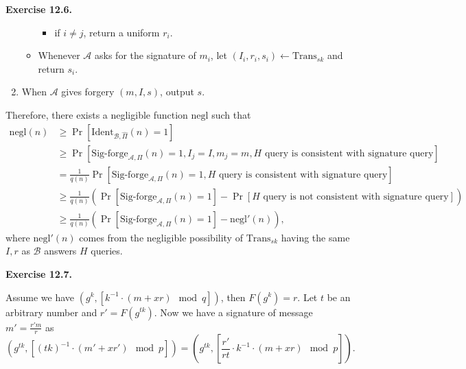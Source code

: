 \documentclass[a4paper]{article}
\newenvironment{exercise}[1]{
	\par
	\noindent\textbf{Exercise #1.}\quad
}{
	\par
	\bigskip
}
\newcommand{\pbra}[1]{\left( #1 \right)}
\newcommand{\sbra}[1]{\left[ #1 \right]}
\newcommand{\Trans}{\mathrm{Trans}}
\newcommand{\Sigforge}{{\mathrm{Sig}\text{-}\mathrm{forge}}}
\newcommand{\Ident}{\mathrm{Ident}}
\newcommand{\negl}{\mathrm{negl}}
\newcommand{\Acal}{\mathcal{A}}
\newcommand{\Bcal}{\mathcal{B}}
\begin{document}
\begin{exercise}{12.6}
\begin{enumerate}
\begin{itemize}
\begin{itemize}
                    \item if $i\neq j$, return a uniform $r_i$.
                \end{itemize}
            \item Whenever $\Acal$ asks for the signature of $m_i$, let $(I_i,r_i,s_i)\gets\Trans_{sk}$
                and return $s_i$.
            \end{itemize}
        \item When $\Acal$ gives forgery $(m,I,s)$, output $s$.
    \end{enumerate}
    Therefore, there exists a negligible function $\negl$ such that
    \begin{align*}
        \negl(n)&\geq\Pr\sbra{\Ident_{\Bcal,\widehat\Pi}(n)=1}\\
        &\geq\Pr\sbra{\Sigforge_{\Acal,\Pi}(n)=1,I_j=I, m_j=m,
        H\text{ query is consistent with signature query}}\\
        &=\frac1{q(n)}\Pr\sbra{\Sigforge_{\Acal,\Pi}(n)=1,
        H\text{ query is consistent with signature query}}\\
        &\geq\frac1{q(n)}\pbra{\Pr\sbra{\Sigforge_{\Acal,\Pi}(n)=1}
        -\Pr\sbra{H\text{ query is not consistent with signature query}}}\\
        &\geq\frac1{q(n)}\pbra{\Pr\sbra{\Sigforge_{\Acal,\Pi}(n)=1}-\negl'(n)},
    \end{align*}
    where $\negl'(n)$ comes from the negligible possibility of $\Trans_{sk}$ having the same $I,r$ as
    $\Bcal$ answers $H$ queries.
\end{exercise}

\begin{exercise}{12.7}
    Assume we have $\pbra{g^k,\sbra{k^{-1}\cdot(m+xr)\mod q}}$, then $F(g^k)=r$.
    Let $t$ be an arbitrary number and $r'=F(g^{tk})$.
    Now we have a signature of message $m'=\frac{r'm}{r}$ as
    $$
    \pbra{g^{tk},\sbra{(tk)^{-1}\cdot(m'+xr')\mod p}}=\pbra{g^{tk},\sbra{\frac{r'}{rt}\cdot k^{-1}\cdot(m+xr)\mod p}}.
    $$
\end{exercise}
\end{document}
